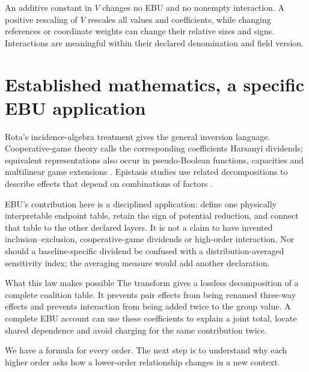 An additive constant in $V$ changes no EBU and no nonempty interaction. A positive rescaling of $V$ rescales all values and coefficients, while changing references or coordinate weights can change their relative sizes and signs. Interactions are meaningful within their declared denomination and field version.

\section{Established mathematics, a specific EBU application}
Rota's incidence-algebra treatment gives the general inversion language. Cooperative-game theory calls the corresponding coefficients Harsanyi dividends; equivalent representations also occur in pseudo-Boolean functions, capacities and multilinear game extensions \cite{rota,harsanyi,grabisch,boros,owen}. Epistasis studies use related decompositions to describe effects that depend on combinations of factors \cite{poelwijk}.

EBU's contribution here is a disciplined application: define one physically interpretable endpoint table, retain the sign of potential reduction, and connect that table to the other declared layers. It is not a claim to have invented inclusion--exclusion, cooperative-game dividends or high-order interaction. Nor should a baseline-specific dividend be confused with a distribution-averaged sensitivity index; the averaging measure would add another declaration.

\begin{intuitionbox}{What this law makes possible}
The transform gives a lossless decomposition of a complete coalition table. It prevents pair effects from being renamed three-way effects and prevents interaction from being added twice to the group value. A complete EBU account can use these coefficients to explain a joint total, locate shared dependence and avoid charging for the same contribution twice.
\end{intuitionbox}

We have a formula for every order. The next step is to understand why each higher order asks how a lower-order relationship changes in a new context.
